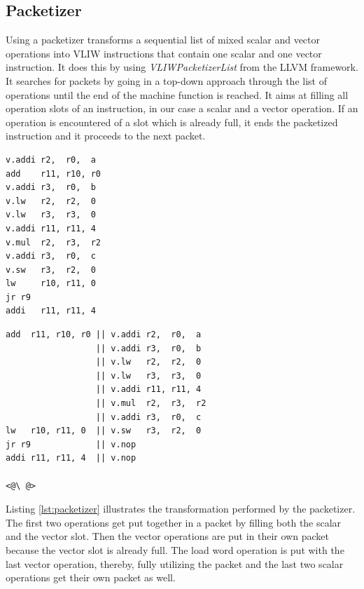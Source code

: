 \subsection{Packetizer}
Using a packetizer transforms a sequential list of mixed scalar and vector operations into VLIW instructions that contain one scalar and one vector instruction. It does this by using \emph{VLIWPacketizerList} from the LLVM framework. 
It searches for packets by going in a top-down approach through the list of operations until the end of the machine function is reached. It aims at filling all operation slots of an instruction, in our case a scalar and a vector operation. If an operation is encountered of a slot which is already full, it ends the packetized instruction and it proceeds to the next packet. 

\label{lst:packetizer}
\begin{center}
\hspace{2px}\begin{minipage}{.45\textwidth}
\begin{lstlisting}[frame=tlrb]
v.addi r2,  r0,  a
add    r11, r10, r0
v.addi r3,  r0,  b
v.lw   r2,  r2,  0
v.lw   r3,  r3,  0
v.addi r11, r11, 4
v.mul  r2,  r3,  r2
v.addi r3,  r0,  c
v.sw   r3,  r2,  0
lw     r10, r11, 0
jr r9
addi   r11, r11, 4
\end{lstlisting}
\end{minipage}\hfill
\begin{minipage}{.5\textwidth}
\begin{lstlisting}[frame=tlrb]
add  r11, r10, r0 || v.addi r2,  r0,  a
                  || v.addi r3,  r0,  b
                  || v.lw   r2,  r2,  0
                  || v.lw   r3,  r3,  0
                  || v.addi r11, r11, 4
                  || v.mul  r2,  r3,  r2
                  || v.addi r3,  r0,  c
lw   r10, r11, 0  || v.sw   r3,  r2,  0
jr r9             || v.nop
addi r11, r11, 4  || v.nop

<@\ @>
\end{lstlisting}
\end{minipage}
\end{center}

Listing \ref{lst:packetizer} illustrates the transformation performed by the packetizer. The first two operations get put together in a packet by filling both the scalar and the vector slot. Then the vector operations are put in their own packet because the vector slot is already full. The load word operation is put with the last vector operation, thereby, fully utilizing the packet and the last two scalar operations get their own packet as well. %

